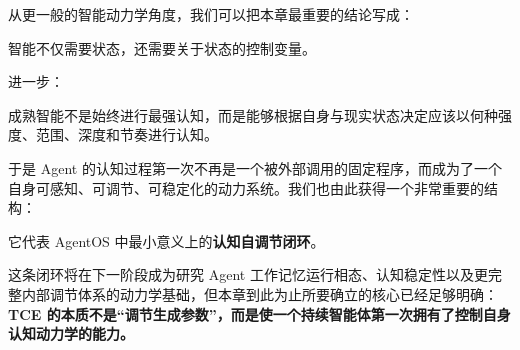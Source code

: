 从更一般的智能动力学角度，我们可以把本章最重要的结论写成：
\begin{statementbox}
智能不仅需要状态，还需要关于状态的控制变量。
\end{statementbox}
进一步：
\begin{statementbox}
成熟智能不是始终进行最强认知，而是能够根据自身与现实状态决定应该以何种强度、范围、深度和节奏进行认知。
\end{statementbox}

于是 Agent 的认知过程第一次不再是一个被外部调用的固定程序，而成为了一个自身可感知、可调节、可稳定化的动力系统。我们也由此获得一个非常重要的结构：

\begin{statementbox}
\centering
{}
\end{statementbox}

它代表 AgentOS 中最小意义上的\textbf{认知自调节闭环}。

这条闭环将在下一阶段成为研究 Agent 工作记忆运行相态、认知稳定性以及更完整内部调节体系的动力学基础，但本章到此为止所要确立的核心已经足够明确：\textbf{TCE 的本质不是“调节生成参数”，而是使一个持续智能体第一次拥有了控制自身认知动力学的能力。}
